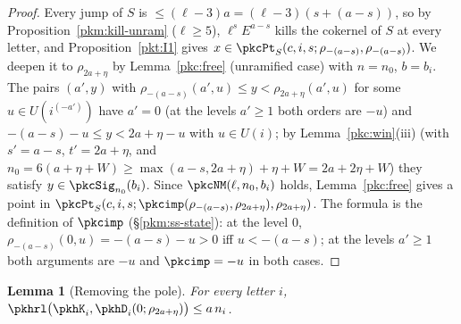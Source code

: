 \documentclass[10pt]{amsart}
\newtheorem{lemma}[theorem]{Lemma}
\theoremstyle{definition}
\theoremstyle{remark}
\begin{document}
\begin{proof}
Every jump of $S$ is $\le(\ell-3)a=(\ell-3)(s+(a-s))$, so by Proposition~\ref{pkm:kill-unram} ($\ell\ge5$),
$\ell^sE^{a-s}$ kills the cokernel of $S$ at every letter, and Proposition~\ref{pkt:I1} gives
$x\in\pkcPt_S(c,i,s;\rho_{-(a-s)},\rho_{-(a-s)})$. We deepen it to $\rho_{2a+\eta}$ by Lemma~\ref{pkc:free}
(unramified case) with $n=n_0$, $b=b_i$. The pairs $(a',y)$ with $\rho_{-(a-s)}(a',u)\le y<\rho_{2a+\eta}(a',u)$
for some $u\in U(i^{(-a')})$ have $a'=0$ (at the levels $a'\ge1$ both orders are $-u$) and
$-(a-s)-u\le y<2a+\eta-u$ with $u\in U(i)$; by Lemma~\ref{pkc:win}(iii) (with $s'=a-s$, $t'=2a+\eta$, and
$n_0=6(a+\eta+W)\ge\max(a-s,2a+\eta)+\eta+W=2a+2\eta+W$) they satisfy $y\in\pkcSig_{n_0}(b_i)$. Since
$\pkcNM(\ell,n_0,b_i)$ holds, Lemma~\ref{pkc:free} gives a point in
$\pkcPt_S(c,i,s;\pkcimp(\rho_{-(a-s)},\rho_{2a+\eta}),\rho_{2a+\eta})$. The formula is the definition of
$\pkcimp$ (\S\ref{pkm:ss-state}): at the level $0$, $\rho_{-(a-s)}(0,u)=-(a-s)-u>0$ iff $u<-(a-s)$; at the levels
$a'\ge1$ both arguments are $-u$ and $\pkcimp=-u$ in both cases.
\end{proof}

\begin{lemma}[Removing the pole]\label{pkh:pole}
For every letter $i$, $\pkhrl\bigl(\pkhK_i,\pkhD_i(0;\rho_{2a+\eta})\bigr)\le a\,n_i$.
\end{lemma}
\end{document}
